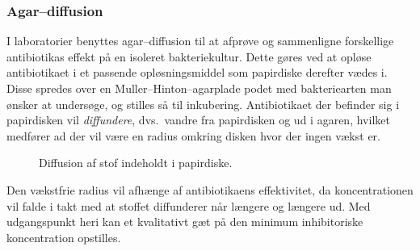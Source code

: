     \subsubsection{Agar--diffusion}
    I laboratorier benyttes agar--diffusion til at afprøve og sammenligne forskellige antibiotikas effekt på en isoleret bakteriekultur. Dette gøres ved at opløse antibiotikaet i et passende opløsningsmiddel som papirdiske derefter vædes i. Disse spredes over en Muller--Hinton--agarplade podet med bakteriearten man ønsker at undersøge, og stilles så til inkubering. Antibiotikaet der befinder sig i papirdisken vil \textit{diffundere}, dvs.\ vandre fra papirdisken og ud i agaren, hvilket medfører ad der vil være en radius omkring disken hvor der ingen vækst er.
    \begin{figure}[H]\centering
        \caption{Diffusion af stof indeholdt i papirdiske.}
    \end{figure}
    Den vækstfrie radius vil afhænge af antibiotikaens effektivitet, da koncentrationen vil falde i takt med at stoffet diffunderer når længere og længere ud. Med udgangspunkt heri kan et kvalitativt gæt på den minimum inhibitoriske koncentration opstilles.

